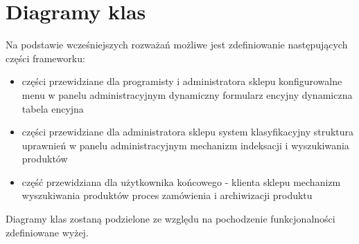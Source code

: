 \newpage
\section{Diagramy klas}

Na podstawie wcześniejszych rozważań możliwe jest zdefiniowanie następujących części frameworku: 
\begin{itemize}
	\item części przewidziane dla programisty i administratora sklepu
	\subitem konfigurowalne menu w panelu administracyjnym
	\subitem dynamiczny formularz encyjny
	\subitem dynamiczna tabela encyjna
	\item części przewidziane dla administratora sklepu
	\subitem system klasyfikacyjny
	\subitem struktura uprawnień w panelu administracyjnym
	\subitem mechanizm indeksacji i wyszukiwania produktów
	\item część przewidziana dla użytkownika końcowego - klienta sklepu
	\subitem mechanizm wyszukiwania produktów
	\subitem proces zamówienia i archiwizacji produktu
\end{itemize}
Diagramy klas zostaną podzielone ze względu na pochodzenie funkcjonalności zdefiniowane wyżej. 



